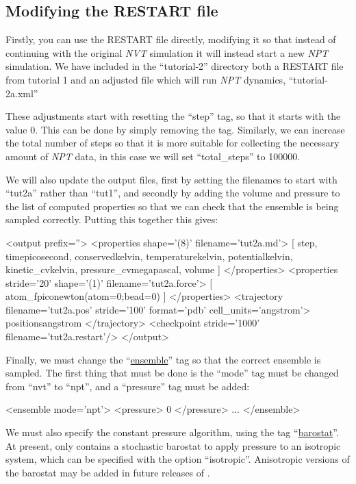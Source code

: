 \documentclass[11pt,english,fleqn]{report}
\newenvironment{code}{%
\footnotesize 
\verbatim
}{
\endverbatim
\normalsize
}
\begin{document}
\subsection{Modifying the RESTART file}

Firstly, you can use the RESTART file directly, modifying it
so that instead of continuing with the original \emph{NVT} simulation
it will instead start a new \emph{NPT} simulation. We have included
in the {}``tutorial-2'' directory both a RESTART file from
tutorial 1 and an adjusted file which will run \emph{NPT} dynamics,
{}``tutorial-2a.xml''

These adjustments start with resetting the {}``step'' tag, so that
it starts with the value 0. This can be done by simply removing the
tag. Similarly, we can increase the total number of
steps so that it is more suitable for collecting the necessary
amount of {\em NPT} data, in this case we will set
{}``total\_steps'' to 100000.

We will also update the output files, first by setting the filenames
to start with {}``tut2a'' rather than {}``tut1'', and secondly by adding
the volume and pressure to the list of computed properties so that
we can check that the ensemble is being sampled correctly.
Putting this together this gives:

\begin{code}
<output prefix=''>
   <properties shape='(8)' filename='tut2a.md'>
      [ step, time{picosecond}, conserved{kelvin}, 
        temperature{kelvin}, potential{kelvin}, kinetic_cv{kelvin}, 
        pressure_cv{megapascal}, volume ] 
   </properties>
   <properties stride='20' shape='(1)' filename='tut2a.force'> 
      [ atom_f{piconewton}(atom=0;bead=0) ] 
   </properties>
   <trajectory filename='tut2a.pos' stride='100' format='pdb' cell_units='angstrom'>
      positions{angstrom}
   </trajectory>
   <checkpoint stride='1000' filename='tut2a.restart'/>
</output>
\end{code}

Finally, we must change the {}``\hyperref[ENSEMBLE]{ensemble}'' 
tag so that the correct
ensemble is sampled. The first thing that must be done is  
the {}``mode'' tag must be changed from {}``nvt'' to {}``npt'',
and a {}``pressure'' tag must be added:

\begin{code}
<ensemble mode='npt'>
   <pressure> 0 </pressure>
   ...
</ensemble>
\end{code}

We must also specify the constant pressure algorithm,
using the tag {}``\hyperref[BAROSTAT]{barostat}''.
At present, \ipi only contains a stochastic barostat to apply pressure
to an isotropic system, which can be specified with the option ``isotropic''. 
Anisotropic versions of the barostat may be added in future releases of \ipi. 
\end{document}
